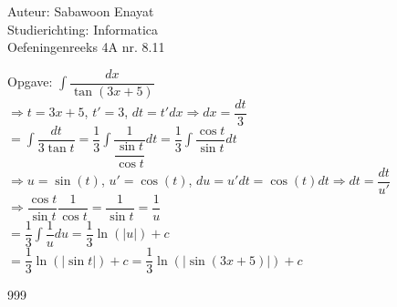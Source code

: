 \documentclass[a4paper]{article}
\begin{document}
  
\noindent \large Auteur: Sabawoon Enayat \\
\noindent \large Studierichting: Informatica\\
\noindent \large Oefeningenreeks 4A nr. 8.11 \\

\newcommand{\dint}{\displaystyle\int}

\medskip

\normalsize

Opgave: $\dint \dfrac{dx}{\tan (3x + 5)}$\\

$\Rightarrow t = 3x + 5$, $t' = 3$, $dt = t'dx \Rightarrow dx = \dfrac{dt}{3}$\\

$= \dint \dfrac{dt}{3\tan t} = \dfrac{1}{3}\dint \dfrac{1}{\dfrac{\sin t}{\cos t}} dt = \dfrac{1}{3}\dint \dfrac{\cos t}{\sin t} dt$\\

$\Rightarrow u = \sin (t)$, $u' = \cos (t)$, $du = u'dt = \cos (t) dt \Rightarrow dt = \dfrac{dt}{u'}$\\

$\Rightarrow \dfrac{\cos t}{\sin t} \dfrac{1}{\cos t} = \dfrac{1}{\sin t} = \dfrac{1}{u}$\\

$= \dfrac{1}{3} \dint \dfrac{1}{u} du = \dfrac{1}{3} \ln\left(|u|\right) + c$\\

$= \dfrac{1}{3} \ln\left(|\sin t|\right) + c = \dfrac{1}{3} \ln\left(|\sin (3x + 5)|\right) + c$\\

\begin{thebibliography}{999}
\end{thebibliography}
\end{document}
